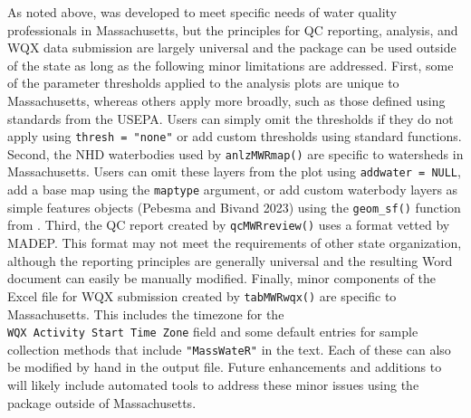 As noted above,  was developed to meet specific needs of water quality professionals in Massachusetts, but the principles for QC reporting, analysis, and WQX data submission are largely universal and the package can be used outside of the state as long as the following minor limitations are addressed. First, some of the parameter thresholds applied to the analysis plots are unique to Massachusetts, whereas others apply more broadly, such as those defined using standards from the USEPA. Users can simply omit the thresholds if they do not apply using \texttt{thresh\ =\ "none"} or add custom thresholds using standard  functions. Second, the NHD waterbodies used by \texttt{anlzMWRmap()} are specific to watersheds in Massachusetts. Users can omit these layers from the plot using \texttt{addwater\ =\ NULL}, add a base map using the \texttt{maptype} argument, or add custom waterbody layers as simple features objects (Pebesma and Bivand 2023) using the \texttt{geom\_sf()} function from . Third, the QC report created by \texttt{qcMWRreview()} uses a format vetted by MADEP. This format may not meet the requirements of other state organization, although the reporting principles are generally universal and the resulting Word document can easily be manually modified. Finally, minor components of the Excel file for WQX submission created by \texttt{tabMWRwqx()} are specific to Massachusetts. This includes the timezone for the \texttt{WQX\ Activity\ Start\ Time\ Zone} field and some default entries for sample collection methods that include \texttt{"MassWateR"} in the text. Each of these can also be modified by hand in the output file. Future enhancements and additions to  will likely include automated tools to address these minor issues using the package outside of Massachusetts.

